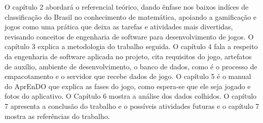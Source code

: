 O capítulo 2 abordará o referencial teórico, dando ênfase nos baixos indíces de classificação do Brasil no conhecimento de matemática, apoiando a gamificação e jogos como uma prática que deixa as tarefas e atividades mais divertidas, revisando conceitos de engenharia de software para desenvolvimento de jogos.
O capítulo 3 explica a metodologia do trabalho seguida. O capítulo 4 fala a respeito da engenharia de software aplicada no projeto, cita requisitos do jogo, artefatos de auxílio, ambiente de desenvolvimento, o banco de dados, como é o processo de empacotamento e o servidor que recebe dados de jogo. O capítulo 5 é o manual do AprEnDO que explica as fases do jogo, como espera-se que ele seja jogado e fotos do aplicativo. O Capítulo 6 mostra a análise dos dados colhidos. O capítulo 7 apresenta a conclusão do trabalho e o possíveis atividades futuras e o capítulo 7 mostra as referências do trabalho.
